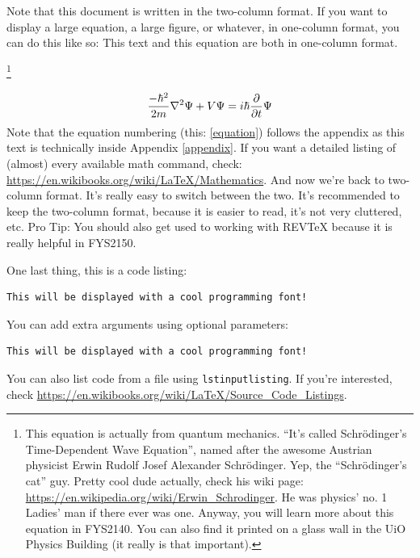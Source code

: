 \documentclass[reprint,english,notitlepage]{revtex4-2}  %
\begin{document}

\clearpage
Note that this document is written in the two-column format. If you want to display a large equation, a large figure, or whatever, in one-column format, you can do this like so:
\onecolumngrid
\vspace{1cm} %
This text and this equation are both in one-column format.

\footnote{This equation is actually from quantum mechanics. ``It's called Schrödinger's Time-Dependent Wave Equation'', named after the awesome Austrian physicist Erwin Rudolf Josef Alexander Schrödinger. Yep, the ``Schrödinger's cat'' guy. Pretty cool dude actually, check his wiki page: \url{https://en.wikipedia.org/wiki/Erwin_Schrodinger}. He was physics' no. 1 Ladies' man if there ever was one. Anyway, you will learn more about this equation in FYS2140. You can also find it printed on a glass wall in the UiO Physics Building (it really is that important).}

\begin{equation}\label{equation}
\frac{-\hbar^2}{2m}\laplacian{\Psi}+V\Psi=i\hbar\pdv{t}\Psi
\end{equation}
Note that the equation numbering (this: \ref{equation}) follows the appendix as this text is technically inside Appendix \ref{appendix}. If you want a detailed listing of (almost) every available math command, check: \url{https://en.wikibooks.org/wiki/LaTeX/Mathematics}.
\vspace{1cm} %
\twocolumngrid
And now we're back to two-column format. It's really easy to switch between the two. It's recommended to keep the two-column format, because it is easier to read, it's not very cluttered, etc. Pro Tip: You should also get used to working with REVTeX because it is really helpful in FYS2150.

One last thing, this is a code listing:
\begin{lstlisting}
This will be displayed with a cool programming font!
\end{lstlisting}
You can add extra arguments using optional parameters:
\begin{lstlisting}[morekeywords={cool}]
This will be displayed with a cool programming font!
\end{lstlisting}
You can also list code from a file using \texttt{lstinputlisting}. If you're interested, check \url{https://en.wikibooks.org/wiki/LaTeX/Source_Code_Listings}.
\end{document}
